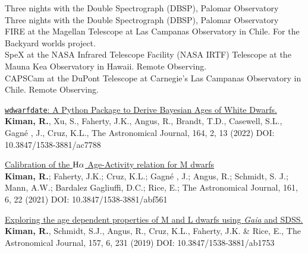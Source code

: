 \documentclass[10pt]{cv}
\begin{document}
\begin{llist}

Three nights with the Double Spectrograph (DBSP), 
Palomar Observatory \\
Three nights with the Double Spectrograph (DBSP), 
Palomar Observatory \\
FIRE at the Magellan Telescope at Las Campanas Observatory
 in Chile. For the Backyard worlds project. \\
SpeX at the NASA Infrared Telescope Facility (NASA IRTF) 	
Telescope at the Mauna Kea Observatory in Hawaii. Remote Observing. \\
CAPSCam at the DuPont Telescope	
at Carnegie's Las Campanas Observatory in Chile. Remote Observing.




\begin{etaremune}
  \item \href{https://ui.adsabs.harvard.edu/abs/2022AJ....164...62K/abstract}{\texttt{wdwarfdate}: A Python Package to Derive Bayesian Ages of White Dwarfs.}\\ \textbf{Kiman, R.}, Xu, S., Faherty, J.K., Angus, R., Brandt, T.D., Casewell, S.L., Gagn\'e , J., Cruz, K.L., The Astronomical Journal, 164, 2, 13 (2022) DOI: 10.3847/1538-3881/ac7788
  \item \href{https://ui.adsabs.harvard.edu/abs/2021AJ....161..277K/abstract}{Calibration of the ${\rm H}\alpha$ Age-Activity relation for M dwarfs}\\ \textbf{Kiman, R.}; Faherty, J.K.; Cruz, K.L.; Gagn\'e , J.; Angus, R.; Schmidt, S. J.; Mann, A.W.; Bardalez Gagliuffi, D.C.; Rice, E.; The Astronomical Journal, 161, 6, 22 (2021) DOI: 10.3847/1538-3881/abf561
  \item \href{https://ui.adsabs.harvard.edu/abs/2019AJ....157..231K/abstract}{Exploring the age dependent properties of M and L dwarfs using \textit{Gaia} and SDSS.}\\ \textbf{Kiman, R.}, Schmidt, S.J., Angus, R., Cruz, K.L., Faherty, J.K. \& Rice, E., The Astronomical Journal, 157, 6, 231 (2019) DOI: 10.3847/1538-3881/ab1753 
\end{etaremune}






\end{llist}
\end{document}
